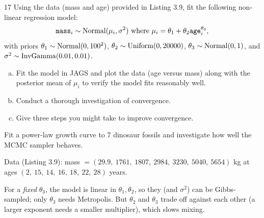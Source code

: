 \documentclass[11pt]{article}
\begin{document}
\begin{problem}{17}
Using the data (mass and age) provided in Listing 3.9, fit the following non-linear regression model:
\[
\texttt{mass}_i\sim\dist{Normal}(\mu_i,\sigma^2)\ \text{where}\ \mu_i=\theta_1+\theta_2\texttt{age}_i^{\theta_3},
\]
with priors $\theta_1\sim\mathrm{Normal}(0,100^2)$, $\theta_2\sim\mathrm{Uniform}(0,20000)$, $\theta_3\sim\mathrm{Normal}(0,1)$, and $\sigma^2\sim\mathrm{InvGamma}(0.01,0.01)$.
\begin{enumerate}[(a)]
\item Fit the model in JAGS and plot the data (age versus mass) along with the posterior mean of $\mu_i$ to verify the model fits reasonably well.
\item Conduct a thorough investigation of convergence.
\item Give three steps you might take to improve convergence.
\end{enumerate}
\end{problem}

\begin{restate}
Fit a power-law growth curve to 7 dinosaur fossils and investigate how well the MCMC sampler behaves.
\end{restate}

\begin{recall}
Data (Listing 3.9): mass $=(29.9,\ 1761,\ 1807,\ 2984,\ 3230,\ 5040,\ 5654)$ kg at ages $(2,\ 15,\ 14,\ 16,\ 18,\ 22,\ 28)$ years.
\end{recall}

\begin{keyidea}
For a \emph{fixed} $\theta_3$, the model is linear in $\theta_1,\theta_2$, so they (and $\sigma^2$) can be Gibbs-sampled; only $\theta_3$ needs Metropolis. But $\theta_2$ and $\theta_3$ trade off against each other (a larger exponent needs a smaller multiplier), which slows mixing.
\end{keyidea}
\end{document}
